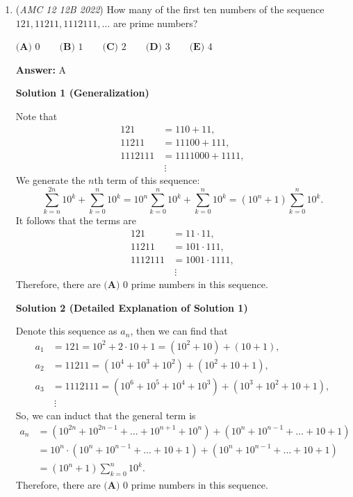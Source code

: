 \begin{enumerate}
 \textbf{Answer: }D



\textbf{Solution}

Notice that $BC = AD = AP + PD = 3 + 2 = 5$.Now, because the question tells us $ABCD$ is a rhombus, $BC = AB = 5$. Thus, by Pythagorean Theorem on $APB$, $BP = 4$.Therefore, 
 \[[ABCD] = AD \times BP = 5 \times 4 = \boxed{\text{D 20}}\]~DUODUOLUO(First time using $\LaTeX$, may have some minor mistakes)

 


	\item (\textit{AMC 12 12B 2022}) How many of the first ten numbers of the sequence $121, 11211, 1112111, \ldots$ are prime numbers?


 $\textbf{(A) } 0 \qquad \textbf{(B) }1 \qquad \textbf{(C) }2 \qquad \textbf{(D) }3 \qquad \textbf{(E) }4$

 \textbf{Answer: }A



\textbf{Solution 1 (Generalization)}

Note that
 \begin{align*} 121 &= 110 + 11, \\ 11211 &= 11100 + 111, \\ 1112111 &= 1111000 + 1111, \\ & \ \vdots \end{align*}
We generate the $n$th term of this sequence:
 \[\sum_{k=n}^{2n}10^k + \sum_{k=0}^{n}10^k = 10^n\sum_{k=0}^{n}10^k + \sum_{k=0}^{n}10^k = \left(10^n+1\right)\sum_{k=0}^{n}10^k.\]It follows that the terms are
 \begin{align*} 121 &= 11\cdot11, \\ 11211 &= 101\cdot111, \\ 1112111 &= 1001\cdot1111, \\ & \ \vdots \end{align*}
Therefore, there are $\boxed{\textbf{(A) } 0}$ prime numbers in this sequence.

 



\textbf{Solution 2 (Detailed Explanation of Solution 1)}

Denote this sequence as $a_{n}$, then we can find that
 \begin{align*} a_{1} &= 121 = 10^2 + 2\cdot10 + 1 = (10^2 + 10) + (10 + 1), \\ a_{2} &= 11211 = (10^4 + 10^3 + 10^2) + (10^2 + 10 + 1), \\ a_{3} &= 1112111 = (10^6 + 10^5 + 10^4 + 10^3) + (10^3 + 10^2 + 10 + 1), \\ & \ \vdots \end{align*}
So, we can induct that the general term is
 \begin{align*} a_n &= (10^{2n} + 10^{2n-1} + \ldots + 10^{n+1} + 10^n) + (10^n + 10^{n-1} + \ldots +10 + 1) \\ &= 10^n\cdot(10^n + 10^{n-1} + \ldots +10 + 1) + (10^n + 10^{n-1} + \ldots +10 + 1) \\ &= \left(10^n+1\right)\sum_{k=0}^{n}10^k. \end{align*}
Therefore, there are $\boxed{\textbf{(A) } 0}$ prime numbers in this sequence.


\end{enumerate}
